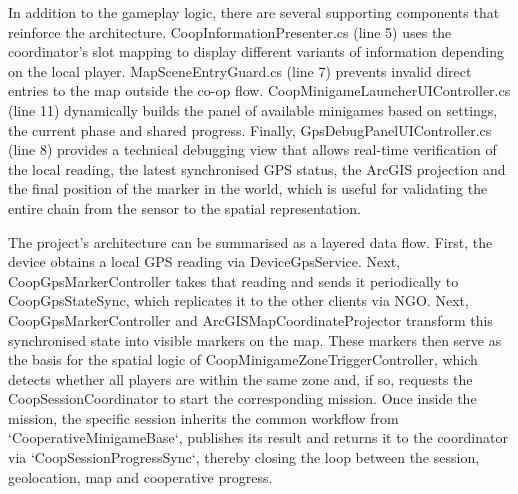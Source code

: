 In addition to the gameplay logic, there are several supporting components that reinforce the architecture. CoopInformationPresenter.cs (line 5) uses the coordinator’s slot mapping to display different variants of information depending on the local player. MapSceneEntryGuard.cs (line 7) prevents invalid direct entries to the map outside the co-op flow. CoopMinigameLauncherUIController.cs (line 11) dynamically builds the panel of available minigames based on settings, the current phase and shared progress. Finally, GpsDebugPanelUIController.cs (line 8) provides a technical debugging view that allows real-time verification of the local reading, the latest synchronised GPS status, the ArcGIS projection and the final position of the marker in the world, which is useful for validating the entire chain from the sensor to the spatial representation.

The project’s architecture can be summarised as a layered data flow. First, the device obtains a local GPS reading via DeviceGpsService. Next, CoopGpsMarkerController takes that reading and sends it periodically to CoopGpsStateSync, which replicates it to the other clients via NGO. Next, CoopGpsMarkerController and ArcGISMapCoordinateProjector transform this synchronised state into visible markers on the map. These markers then serve as the basis for the spatial logic of CoopMinigameZoneTriggerController, which detects whether all players are within the same zone and, if so, requests the CoopSessionCoordinator to start the corresponding mission. Once inside the mission, the specific session inherits the common workflow from `CooperativeMinigameBase`, publishes its result and returns it to the coordinator via `CoopSessionProgressSync`, thereby closing the loop between the session, geolocation, map and cooperative progress.